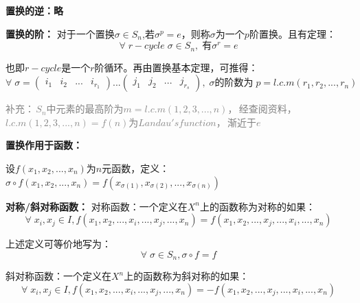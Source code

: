 \documentclass[zihao=-4,UTF8]{report}
\begin{document}
\textbf{置换的逆：略}

\textbf{置换的阶：}
对于一个置换$\sigma \in S_{n}$,若$\sigma^{p}=e$，则称$\sigma$为一个$p$阶置换。且有定理：
\begin{equation*}
    \forall \; r-cycle \; \sigma \in S_{n},\; \text{有}\sigma ^{r}=e
\end{equation*}\par
也即$r-cycle$是一个$r$阶循环。再由置换基本定理，可推得：
\begin{equation*}
    \forall \; \sigma=
    \begin{pmatrix}
        i_{1}&i_{2}&...&i_{r_{1}}
    \end{pmatrix}
    ...
    \begin{pmatrix}
        j_{1}&j_{2}&...&j_{r_{s}}
    \end{pmatrix}
    ,\; \sigma \text{的阶数为}\; p=l.c.m(r_{1},r_{2},...,r_{n})
\end{equation*}\par
\textcolor{gray}{补充：\,$S_{n}$中元素的最高阶为$m=l.c.m(1,2,3,...,n)$，\,经查阅资料，\,$l.c.m(1,2,3,...,n)=f(n)$为$Landau's function$，\,渐近于$e$}

\textbf{置换作用于函数：}\par
设$f(x_{1},x_{2},...,x_{n})$为$n$元函数，定义：$\sigma \circ f(x_{1},x_{2},...,x_{n})=f(x_{\sigma(1)},x_{\sigma(2)},...,x_{\sigma(n)})$

\textbf{对称/斜对称函数：}
对称函数：一个定义在$X^{n}$上的函数称为对称的如果：
\begin{equation*}
    \forall \; x_{i},x_{j}\in I, f(x_{1},x_{2},...,x_{i},...,x_{j},...,x_{n})=f(x_{1},x_{2},...,x_{j},...,x_{i},...,x_{n})
\end{equation*}\par
上述定义可等价地写为：
\begin{equation*}
    \forall \; \sigma \in S_{n},\sigma \circ f=f
\end{equation*} \par
斜对称函数：一个定义在$X^{n}$上的函数称为斜对称的如果：
\begin{equation*}
    \forall \; x_{i},x_{j}\in I, f(x_{1},x_{2},...,x_{i},...,x_{j},...,x_{n})=-f(x_{1},x_{2},...,x_{j},...,x_{i},...,x_{n})
\end{equation*}\par
\end{document}
